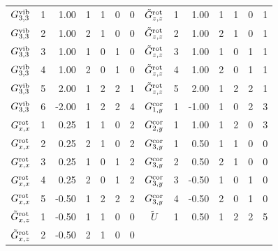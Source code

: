 \begin{table}[h]
\begin{tabular}{crrrrrrcrrrrrr}
$  G^{\rm vib}_{    3,  3}$   &   1  &  1.00 & 1 & 1 & 0 & 0  &  $  \tilde{G}^{\rm rot}_{     z,  z}$   &    1  &  1.00 & 1 & 1 & 0 & 1 \\
$  G^{\rm vib}_{    3,  3}$   &   2  &  1.00 & 2 & 1 & 0 & 0  &  $  \tilde{G}^{\rm rot}_{     z,  z}$   &    2  &  1.00 & 2 & 1 & 0 & 1 \\
$  G^{\rm vib}_{    3,  3}$   &   3  &  1.00 & 1 & 0 & 1 & 0  &  $  \tilde{G}^{\rm rot}_{     z,  z}$   &    3  &  1.00 & 1 & 0 & 1 & 1 \\
$  G^{\rm vib}_{    3,  3}$   &   4  &  1.00 & 2 & 0 & 1 & 0  &  $  \tilde{G}^{\rm rot}_{     z,  z}$   &    4  &  1.00 & 2 & 0 & 1 & 1 \\
$  G^{\rm vib}_{    3,  3}$   &   5  &  2.00 & 1 & 2 & 2 & 1  &  $  \tilde{G}^{\rm rot}_{     z,  z}$   &    5  &  2.00 & 1 & 2 & 2 & 1 \\
$  G^{\rm vib}_{    3,  3}$   &   6  & -2.00 & 1 & 2 & 2 & 4  &  $  G^{\rm cor}_{     1,  y}$   &    1  & -1.00 & 1 & 0 & 2 & 3 \\  
$  G^{\rm rot}_{    x,  x}$   &   1  &  0.25 & 1 & 1 & 0 & 2  &  $  G^{\rm cor}_{     2,  y}$   &    1  &  1.00 & 1 & 2 & 0 & 3 \\
$  G^{\rm rot}_{    x,  x}$   &   2  &  0.25 & 2 & 1 & 0 & 2  &  $  G^{\rm cor}_{     3,  y}$   &    1  &  0.50 & 1 & 1 & 0 & 0 \\
$  G^{\rm rot}_{    x,  x}$   &   3  &  0.25 & 1 & 0 & 1 & 2  &  $  G^{\rm cor}_{     3,  y}$   &    2  &  0.50 & 2 & 1 & 0 & 0 \\
$  G^{\rm rot}_{    x,  x}$   &   4  &  0.25 & 2 & 0 & 1 & 2  &  $  G^{\rm cor}_{     3,  y}$   &    3  & -0.50 & 1 & 0 & 1 & 0 \\
$  G^{\rm rot}_{    x,  x}$   &   5  & -0.50 & 1 & 2 & 2 & 2  &  $  G^{\rm cor}_{     3,  y}$   &    4  & -0.50 & 2 & 0 & 1 & 0 \\
$  \tilde{G}^{\rm rot}_{    x,  z}$   &   1  & -0.50 & 1 & 1 & 0 & 0  &  $  \tilde{U}$   &    1  &  0.50 & 1 & 2 & 2 & 5 \\
$  \tilde{G}^{\rm rot}_{    x,  z}$   &   2  & -0.50 & 2 & 1 & 0 & 0 \\
\hline
\hline
    \end{tabular}
\end{table}